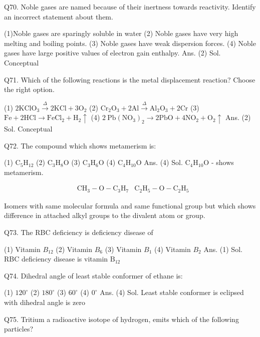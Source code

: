 \begin{enumerate}
Q70. Noble gases are named because of their inertness towards reactivity. Identify an incorrect statement about them.

(1)Noble gases are sparingly soluble in water
(2) Noble gases have very high melting and boiling points.
(3) Noble gases have weak dispersion forces.
(4) Noble gases have large positive values of electron gain enthalpy.
Ans. (2)
Sol. Conceptual

Q71. 
Which of the following reactions is the metal displacement reaction? Choose the right option.

(1) $2 \mathrm{KClO}_{3} \xrightarrow{\Delta} 2 \mathrm{KCl}+3 \mathrm{O}_{2}$
(2) $\mathrm{Cr}_{2} \mathrm{O}_{3}+2 \mathrm{Al} \xrightarrow{\Delta} \mathrm{Al}_{2} \mathrm{O}_{3}+2 \mathrm{Cr}$
(3) $\mathrm{Fe}+2 \mathrm{HCl} \rightarrow \mathrm{FeCl}_{2}+\mathrm{H}_{2} \uparrow$
(4) $2 \mathrm{~Pb}\left(\mathrm{NO}_{3}\right)_{2} \rightarrow 2 \mathrm{PbO}+4 \mathrm{NO}_{2}+\mathrm{O}_{2} \uparrow$
Ans. (2)
Sol. Conceptual

Q72. The compound which shows metamerism is:

(1) $\mathrm{C}_{5} \mathrm{H}_{12}$
(2) $\mathrm{C}_{3} \mathrm{H}_{8} \mathrm{O}$
(3) $\mathrm{C}_{3} \mathrm{H}_{6} \mathrm{O}$
(4) $\mathrm{C}_{4} \mathrm{H}_{10} \mathrm{O}$
Ans. (4)
Sol. $\mathrm{C}_{4} \mathrm{H}_{10} \mathrm{O}$ - shows metamerism.

$$
\begin{aligned}
& \mathrm{CH}_{3}-\mathrm{O}-\mathrm{C}_{3} \mathrm{H}_{7} 
& \mathrm{C}_{2} \mathrm{H}_{5}-\mathrm{O}-\mathrm{C}_{2} \mathrm{H}_{5}
\end{aligned}
$$

Isomers with same molecular formula and same functional group but which shows difference in attached alkyl groups to the divalent atom or group.

Q73. The RBC deficiency is deficiency disease of

(1) Vitamin $B_{12}$
(2) Vitamin $B_{6}$
(3) Vitamin $B_{1}$
(4) Vitamin $B_{2}$
Ans. (1)
Sol. RBC deficiency disease is vitamin $\mathrm{B}_{12}$

Q74. Dihedral angle of least stable conformer of ethane is:

(1) $120^{\circ}$
(2) $180^{\circ}$
(3) $60^{\circ}$
(4) $0^{\circ}$
Ans. (4)
Sol. Least stable conformer is eclipsed with dihedral angle is zero

Q75. Tritium a radioactive isotope of hydrogen, emits which of the following particles?


\end{enumerate}
